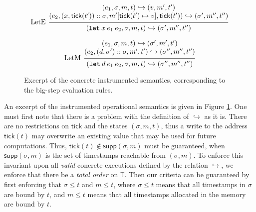\documentclass[acmsmall,screen,review]{acmart}\settopmatter{printfolios=true,printccs=false,printacmref=false}
\newcommand*{\cons}{::}
\newcommand*{\modid}{d}
\newcommand*{\Time}{\mathbb{T}}
\newcommand*{\ctx}{\sigma}
\newcommand*{\mem}{m}
\newcommand*{\semarrow}{\hookrightarrow}
\newcommand*{\tick}{\mathsf{tick}}
\begin{document}
\begin{figure}[t!]
  \[
    \begin{prooftree}
      \hypo{
        \begin{matrix}
          (e_{1}, \ctx, \mem, t)
          \semarrow
          (v, \mem', t') \\
          (e_{2}, (x, \tick(t'))\cons \ctx, \mem'[\tick(t')\mapsto v], \tick(t'))
          \semarrow
          (\ctx', \mem'', t'')
        \end{matrix}
      }
      \infer[left label=LetE]1{
      (\mathtt{let}\:x\:e_1\:e_2, \ctx, \mem, t)
      \semarrow
      (\ctx', \mem'', t'')
      }
    \end{prooftree}
  \]

  \[
    \begin{prooftree}
      \hypo{
        \begin{matrix}
          (e_{1}, \ctx, \mem, t)
          \semarrow
          (\ctx', \mem', t') \\
          (e_{2}, (\modid, \ctx')\cons \ctx, \mem', t')
          \semarrow
          (\ctx'', \mem'', t'')
        \end{matrix}
      }
      \infer[left label=LetM]1{
      (\mathtt{let}\:\modid\:e_{1}\:e_{2}, \ctx, \mem, t)
      \semarrow
      (\ctx'', \mem'', t'')
      }
    \end{prooftree}
  \]
  \caption{Excerpt of the concrete instrumented semantics, corresponding to the big-step evaluation rules.}
  \label{fig:concreach}
\end{figure}

An excerpt of the instrumented operational semantics is given in Figure \ref{fig:concreach}.
One must first note that there is a problem with the definition of $\semarrow$ as it is.
There are no restrictions on $\tick$ and the states $(\ctx,\mem,t)$, thus a write to the address $\tick(t)$ may overwrite an existing value that may be used for future computations.
Thus, $\tick(t)\not\in\mathsf{supp}(\ctx,\mem)$ must be guaranteed, when $\mathsf{supp}(\ctx,\mem)$ is the set of timestamps reachable from $(\ctx,\mem)$.
To enforce this invariant upon all \emph{valid} concrete executions defined by the relation $\semarrow$, we enforce that there be a \emph{total order} on $\Time$.
Then our criteria can be guaranteed by first enforcing that $\ctx\le t$ and $\mem\le t$, where $\ctx\le t$ means that all timestamps in $\ctx$ are bound by $t$, and $\mem\le t$ means that all timestamps allocated in the memory are bound by $t$.
\end{document}
